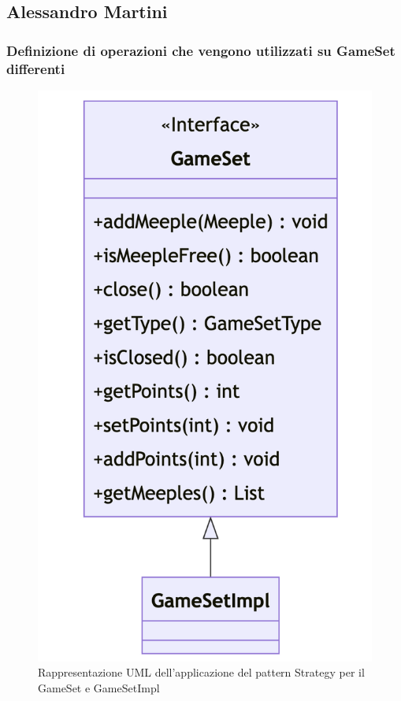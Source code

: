 \subsection*{Alessandro Martini}
\subsubsection*{Definizione di operazioni che vengono utilizzati su GameSet differenti}
\begin{figure}[ht]
    \centering\includegraphics[scale=.4]{images/gameset.png}
    \caption{Rappresentazione UML dell'applicazione del pattern Strategy per il GameSet e GameSetImpl}
\end{figure}
